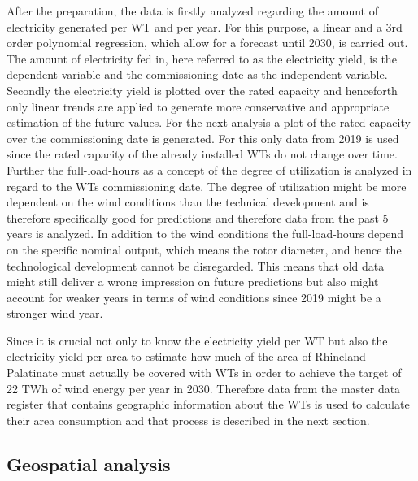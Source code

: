 \documentclass[a4paper,11pt]{article}
\newenvironment{Shaded}{\begin{snugshade}}{\end{snugshade}}
\newcommand{\FunctionTok}[1]{\textcolor[rgb]{0.00,0.00,0.00}{#1}}
\newcommand{\NormalTok}[1]{#1}
\newcommand{\OtherTok}[1]{\textcolor[rgb]{0.56,0.35,0.01}{#1}}
\newcommand{\SpecialCharTok}[1]{\textcolor[rgb]{0.00,0.00,0.00}{#1}}
\begin{document}
After the preparation, the data is firstly analyzed regarding the amount of electricity generated per WT and per year. For this purpose, a linear and a 3rd order polynomial regression, which allow for a forecast until 2030, is carried out. The amount of electricity fed in, here referred to as the electricity yield, is the dependent variable and the commissioning date as the independent variable. Secondly the electricity yield is plotted over the rated capacity and henceforth only linear trends are applied to generate more conservative and appropriate estimation of the future values. For the next analysis a plot of the rated capacity over the commissioning date is generated. For this only data from 2019 is used since the rated capacity of the already installed WTs do not change over time. Further the full-load-hours as a concept of the degree of utilization is analyzed in regard to the WTs commissioning date. The degree of utilization might be more dependent on the wind conditions than the technical development and is therefore specifically good for predictions and therefore data from the past 5 years is analyzed. In addition to the wind conditions the full-load-hours depend on the specific nominal output, which means the rotor diameter, and hence the technological development cannot be disregarded. This means that old data might still deliver a wrong impression on future predictions but also might account for weaker years in terms of wind conditions since 2019 might be a stronger wind year.

Since it is crucial not only to know the electricity yield per WT but also the electricity yield per area to estimate how much of the area of Rhineland-Palatinate must actually be covered with WTs in order to achieve the target of 22 TWh of wind energy per year in 2030. Therefore data from the master data register that contains geographic information about the WTs is used to calculate their area consumption and that process is described in the next section.
\begin{Shaded}
\end{Shaded}
\hypertarget{geospatial-analysis-1}{%
\subsection{Geospatial analysis}\label{geospatial-analysis-1}}
\end{document}
